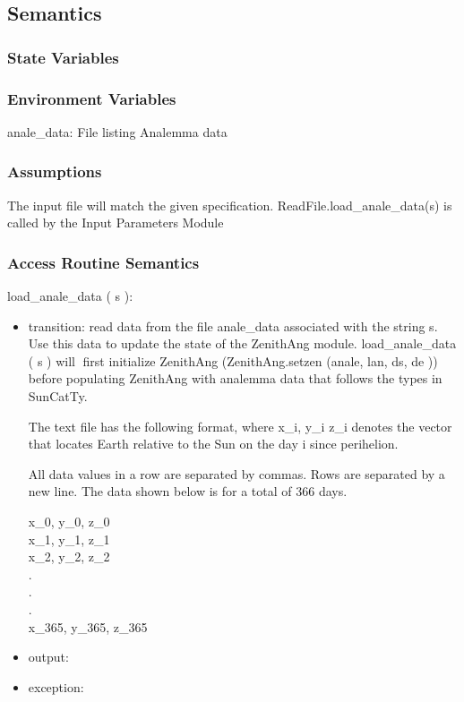 \documentclass[12pt, titlepage]{article}
\begin{document}
\subsection{Semantics}

\subsubsection{State Variables}



\subsubsection{Environment Variables}

anale\_data: File listing Analemma data


\subsubsection{Assumptions}
The input file will match the given specification.
ReadFile.load\_anale\_data(s) is called by the Input Parameters Module

\subsubsection{ Access Routine Semantics}


\noindent  load\_anale\_data ( s ):
\begin{itemize}
\item transition: read data from the file anale\_data associated with the string s. Use
this data to update the state of the ZenithAng module. load\_anale\_data ( s ) will first initialize ZenithAng (ZenithAng.setzen (anale, lan, ds, de )) before populating ZenithAng with analemma data that follows the types in SunCatTy.

The text file has the following format, where x\_i, y\_i z\_i denotes the vector that locates
Earth relative to the Sun on the day i since perihelion.

All data values in a row are separated by commas. Rows are separated by a new line. The data shown below is for a total of 366 days.
\begin{center}
x\_0,   y\_0,   z\_0\\
x\_1,   y\_1,   z\_1\\
x\_2,   y\_2,   z\_2\\
.\\
.\\
.\\
x\_365,   y\_365,   z\_365\\
\end{center}
\item output: 
\item exception: 
\end{itemize}
 
\end{document}
